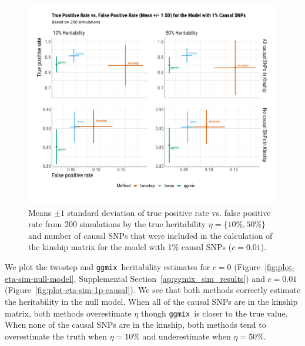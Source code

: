 \documentclass[12pt,letter]{article}\usepackage[]{graphicx}\usepackage[]{color}
\newenvironment{knitrout}{}{} %
\newcommand{\ggmix}{\texttt{ggmix}}
\begin{document}
\begin{knitrout}\scriptsize
{}\color{fgcolor}\begin{figure}[H]

{\centering \includegraphics[width=1\linewidth]{figure/plot-tpr-fpr-sim-1p-causal-1} 

}

\caption[Means $\pm 1$ standard deviation of true positive rate vs]{Means $\pm 1$ standard deviation of true positive rate vs. false positive rate from 200 simulations by the true heritability $\eta = \lbrace 10\%, 50\% \rbrace$ and number of causal SNPs that were included in the calculation of the kinship matrix for the model with 1\% causal SNPs ($c=0.01$).}\label{fig:plot-tpr-fpr-sim-1p-causal}
\end{figure}


\end{knitrout}

We plot the twostep and \ggmix ~heritability estimates for $c=0$ (Figure~\ref{fig:plot-eta-sim-null-model}, Supplemental Section~\ref{ap:ggmix_sim_results}) and $c=0.01$ (Figure~\ref{fig:plot-eta-sim-1p-causal}). We see that both methods correctly estimate the heritability in the null model. When all of the causal SNPs are in the kinship matrix, both methods overestimate $\eta$ though \ggmix ~is closer to the true value. When none of the causal SNPs are in the kinship, both methods tend to overestimate the truth when $\eta=10\%$ and underestimate when $\eta=50\%$.
\end{document}
